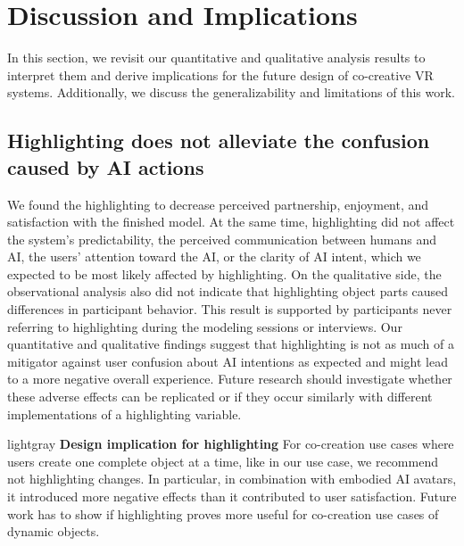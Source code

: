 \section{Discussion and Implications}
In this section, we revisit our quantitative and qualitative analysis results to interpret them and derive implications for the future design of co-creative VR systems. Additionally, we discuss the generalizability and limitations of this work.

\subsection{Highlighting does not alleviate the confusion caused by AI actions}
We found the highlighting to decrease perceived partnership, enjoyment, and satisfaction with the finished model. At the same time, highlighting did not affect the system's predictability, the perceived communication between humans and AI, the users' attention toward the AI, or the clarity of AI intent, which we expected to be most likely affected by highlighting. On the qualitative side, the observational analysis also did not indicate that highlighting object parts caused differences in participant behavior. This result is supported by participants never referring to highlighting during the modeling sessions or interviews. 
Our quantitative and qualitative findings suggest that highlighting is not as much of a mitigator against user confusion about AI intentions as expected and might lead to a more negative overall experience. Future research should investigate whether these adverse effects can be replicated or if they occur similarly with different implementations of a highlighting variable. 


\begin{leftbar}{lightgray}
    \noindent \textbf{Design implication for highlighting}\quad
    For co-creation use cases where users create one complete object at a time, like in our use case, we recommend not highlighting changes. In particular, in combination with embodied AI avatars, it introduced more negative effects than it contributed to user satisfaction. Future work has to show if highlighting proves more useful for co-creation use cases of dynamic objects.
\end{leftbar}  


